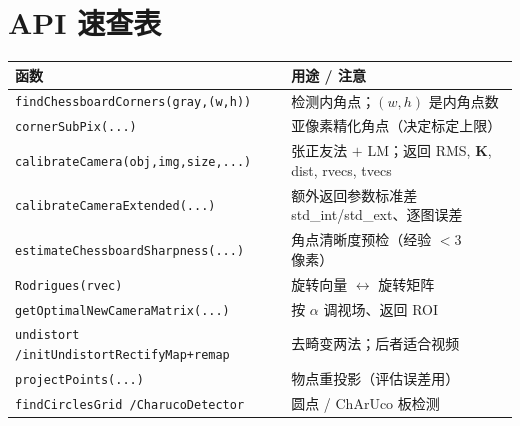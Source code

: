\section*{API 速查表}
\begin{table}[ht]\centering\small
\begin{tabular}{ll}
\toprule
函数 & 用途 / 注意 \\
\midrule
\texttt{findChessboardCorners(gray,(w,h))} & 检测内角点；$(w,h)$ 是内角点数 \\
\texttt{cornerSubPix(...)} & 亚像素精化角点（决定标定上限）\\
\texttt{calibrateCamera(obj,img,size,...)} & 张正友法 $+$ LM；返回 RMS, $\mathbf{K}$, dist, rvecs, tvecs \\
\texttt{calibrateCameraExtended(...)} & 额外返回参数标准差 std\_int/std\_ext、逐图误差 \\
\texttt{estimateChessboardSharpness(...)} & 角点清晰度预检（经验 $<3$ 像素）\\
\texttt{Rodrigues(rvec)} & 旋转向量 $\leftrightarrow$ 旋转矩阵 \\
\texttt{getOptimalNewCameraMatrix(...)} & 按 $\alpha$ 调视场、返回 ROI \\
\texttt{undistort /\allowbreak  initUndistortRectifyMap+remap} & 去畸变两法；后者适合视频 \\
\texttt{projectPoints(...)} & 物点重投影（评估误差用）\\
\texttt{findCirclesGrid /\allowbreak  CharucoDetector} & 圆点 / ChArUco 板检测 \\
\bottomrule
\end{tabular}
\end{table}
